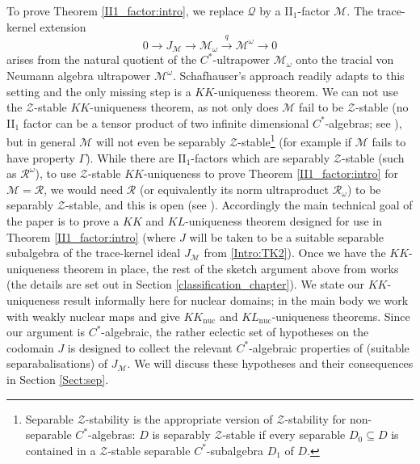 \documentclass[reqno]{amsart}
\theoremstyle{definition}
\theoremstyle{remark}
\numberwithin{equation}{section}
\theoremstyle{definition}
\newcommand{\calM}{\mathcal{M}}
\newcommand{\Z}{\mathcal Z}
\begin{document}
To prove Theorem \ref{II1_factor:intro}, we replace $\mathcal Q$ by a II$_1$-factor $\mathcal M$. The trace-kernel extension
\begin{equation}\label{Intro:TK2}
0\longrightarrow J_{\mathcal M}\longrightarrow \mathcal M_\omega\stackrel{q}{\longrightarrow} \mathcal M^\omega \longrightarrow 0
\end{equation}
arises from the natural quotient of the $C^*$-ultrapower $\mathcal M_\omega$ onto the tracial von Neumann algebra ultrapower $\mathcal M^\omega$. Schafhauser's approach readily adapts to this setting and the only missing step is a $KK$-uniqueness theorem. We can not use the $\Z$-stable $KK$-uniqueness theorem, as not only does $\mathcal M$ fail to be $\mathcal Z$-stable (no II$_1$ factor can be a tensor product of two infinite dimensional $C^*$-algebras; see \cite{Ghasemi}), but in general $\mathcal M$ will not even be separably $\mathcal Z$-stable\footnote{Separable $\Z$-stability is the appropriate version of $\Z$-stability for non-separable $C^*$-algebras: $D$ is separably $\Z$-stable if every separable $D_0\subseteq D$ is contained in a $\Z$-stable separable $C^*$-subalgebra $D_1$ of $D$.}  (for example if $\mathcal M$ fails to have property $\Gamma$). While there are II$_1$-factors which are separably $\mathcal Z$-stable (such as $\mathcal R^\omega$), to use $\Z$-stable $KK$-uniqueness to prove Theorem \ref{II1_factor:intro} for $\mathcal M=\mathcal R$, we would need $\mathcal R$ (or equivalently its norm ultraproduct $\mathcal R_\omega$) to be separably $\Z$-stable, and this is open (see \cite[Problem XCIV]{99Q}). Accordingly the main technical goal of the paper is to prove a $KK$ and $KL$-uniqueness theorem designed for use in Theorem \ref{II1_factor:intro} (where $J$ will be taken to be a suitable separable subalgebra of the trace-kernel ideal $J_{\mathcal M}$ from \eqref{Intro:TK2}).  Once we have the $KK$-uniqueness theorem in place, the rest of the sketch argument above from \cite{Schafhauser.Annals} works (the details are set out in Section \ref{classification_chapter}).  We state our $KK$-uniqueness result informally here for nuclear domains; in the main body we work with weakly nuclear maps and give $KK_{\mathrm{nuc}}$ and $KL_{\mathrm{nuc}}$-uniqueness theorems. Since our argument is $C^*$-algebraic, the rather eclectic set of hypotheses on the codomain $J$ is designed to collect the relevant $C^*$-algebraic properties of (suitable separabalisations) of $J_{\calM}$.  We will discuss these hypotheses and their consequences in Section \ref{Sect:sep}.
\end{document}
